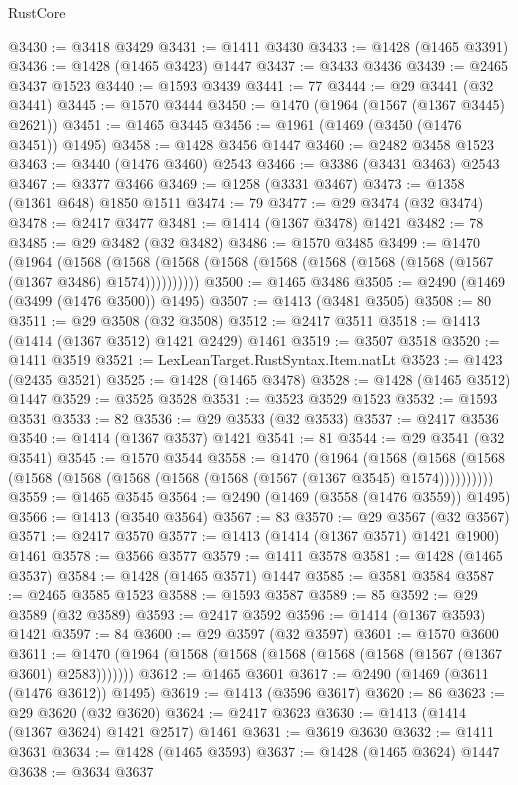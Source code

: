 \begin{lexlean}{RustCore}
\begin{coremodule}
@3430 := @3418 @3429
@3431 := @1411 @3430
@3433 := @1428 (@1465 @3391)
@3436 := @1428 (@1465 @3423) @1447
@3437 := @3433 @3436
@3439 := @2465 @3437 @1523
@3440 := @1593 @3439
@3441 := 77
@3444 := @29 @3441 (@32 @3441)
@3445 := @1570 @3444
@3450 := @1470 (@1964 (@1567 (@1367 @3445) @2621))
@3451 := @1465 @3445
@3456 := @1961 (@1469 (@3450 (@1476 @3451)) @1495)
@3458 := @1428 @3456 @1447
@3460 := @2482 @3458 @1523
@3463 := @3440 (@1476 @3460) @2543
@3466 := @3386 (@3431 @3463) @2543
@3467 := @3377 @3466
@3469 := @1258 (@3331 @3467)
@3473 := @1358 (@1361 @648) @1850 @1511
@3474 := 79
@3477 := @29 @3474 (@32 @3474)
@3478 := @2417 @3477
@3481 := @1414 (@1367 @3478) @1421
@3482 := 78
@3485 := @29 @3482 (@32 @3482)
@3486 := @1570 @3485
@3499 := @1470
    (@1964
      (@1568 (@1568 (@1568 (@1568 (@1568 (@1568 (@1568 (@1568 (@1567 (@1367 @3486) @1574))))))))))
@3500 := @1465 @3486
@3505 := @2490 (@1469 (@3499 (@1476 @3500)) @1495)
@3507 := @1413 (@3481 @3505)
@3508 := 80
@3511 := @29 @3508 (@32 @3508)
@3512 := @2417 @3511
@3518 := @1413 (@1414 (@1367 @3512) @1421 @2429) @1461
@3519 := @3507 @3518
@3520 := @1411 @3519
@3521 := LexLeanTarget.RustSyntax.Item.natLt
@3523 := @1423 (@2435 @3521)
@3525 := @1428 (@1465 @3478)
@3528 := @1428 (@1465 @3512) @1447
@3529 := @3525 @3528
@3531 := @3523 @3529 @1523
@3532 := @1593 @3531
@3533 := 82
@3536 := @29 @3533 (@32 @3533)
@3537 := @2417 @3536
@3540 := @1414 (@1367 @3537) @1421
@3541 := 81
@3544 := @29 @3541 (@32 @3541)
@3545 := @1570 @3544
@3558 := @1470
    (@1964
      (@1568 (@1568 (@1568 (@1568 (@1568 (@1568 (@1568 (@1568 (@1567 (@1367 @3545) @1574))))))))))
@3559 := @1465 @3545
@3564 := @2490 (@1469 (@3558 (@1476 @3559)) @1495)
@3566 := @1413 (@3540 @3564)
@3567 := 83
@3570 := @29 @3567 (@32 @3567)
@3571 := @2417 @3570
@3577 := @1413 (@1414 (@1367 @3571) @1421 @1900) @1461
@3578 := @3566 @3577
@3579 := @1411 @3578
@3581 := @1428 (@1465 @3537)
@3584 := @1428 (@1465 @3571) @1447
@3585 := @3581 @3584
@3587 := @2465 @3585 @1523
@3588 := @1593 @3587
@3589 := 85
@3592 := @29 @3589 (@32 @3589)
@3593 := @2417 @3592
@3596 := @1414 (@1367 @3593) @1421
@3597 := 84
@3600 := @29 @3597 (@32 @3597)
@3601 := @1570 @3600
@3611 := @1470 (@1964 (@1568 (@1568 (@1568 (@1568 (@1568 (@1567 (@1367 @3601) @2583)))))))
@3612 := @1465 @3601
@3617 := @2490 (@1469 (@3611 (@1476 @3612)) @1495)
@3619 := @1413 (@3596 @3617)
@3620 := 86
@3623 := @29 @3620 (@32 @3620)
@3624 := @2417 @3623
@3630 := @1413 (@1414 (@1367 @3624) @1421 @2517) @1461
@3631 := @3619 @3630
@3632 := @1411 @3631
@3634 := @1428 (@1465 @3593)
@3637 := @1428 (@1465 @3624) @1447
@3638 := @3634 @3637

\end{coremodule}
\end{lexlean}
